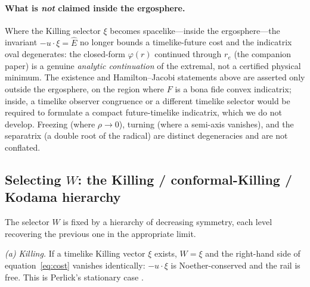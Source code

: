 \documentclass[12pt]{iopart}
\newcommand{\Ehat}{\hat E}
\newcommand{\re}{r_{e}}
\begin{document}
\paragraph{What is \emph{not} claimed inside the ergosphere.} Where the Killing
selector $\xi$ becomes spacelike---inside the ergosphere---the invariant
$-u\cdot\xi=\Ehat$ no longer bounds a timelike-future cost and the indicatrix oval
degenerates: the closed-form $\varphi(r)$ continued through $\re$
(the companion paper) is a genuine \emph{analytic continuation} of the
extremal, not a certified physical minimum. The existence and Hamilton--Jacobi
statements above are asserted only outside the ergosphere, on the region where $F$
is a bona fide convex indicatrix; inside, a timelike observer congruence or a different
timelike selector would be required to formulate a compact future-timelike indicatrix,
which we do not develop. Freezing (where
$\rho\to0$), turning (where a semi-axis vanishes), and the separatrix (a double
root of the radical) are distinct degeneracies and are not conflated.

\subsection{Selecting $W$: the Killing / conformal-Killing / Kodama hierarchy}
\label{sec:whierarchy}
The selector $W$ is fixed by a hierarchy of decreasing symmetry, each level
recovering the previous one in the appropriate limit.

\emph{(a) Killing.} If a timelike Killing vector $\xi$ exists, $W=\xi$ and the
right-hand side of equation~\eqref{eq:cost} vanishes identically: $-u\cdot\xi$ is
Noether-conserved and the rail is free. This is Perlick's stationary case
\cite{Perlick1991}.
\end{document}
